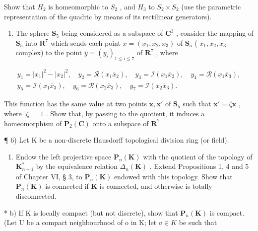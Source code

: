 Show that \(H_{2}\) is homeomorphic to \(S_{2}\) , and \(H_{3}\) to \(S_{2} \times S_{2}\) (use the parametric representation of the quadric by means of its rectilinear generators).

\begin{enumerate}
\def\labelenumi{\arabic{enumi})}
\setcounter{enumi}{4}
\tightlist
\item
  The sphere \(\mathbf{S}_5\) being considered as a subspace of \(\mathbf{C}^3\) , consider the mapping of \(\mathbf{S}_5\) into \(\mathbf{R}^7\) which sends each point \(x = (x_1, x_2, x_3)\) of \(\mathbf{S}_5\) ( \(x_1, x_2, x_3\) complex) to the point \(y = (y_i)_{1 \leqslant i \leqslant 7}\) of \(\mathbf{R}^7\) , where
\end{enumerate}

\[
\begin{array}{c} y _ {1} = | x _ {1} | ^ {2} - | x _ {2} | ^ {2}, \quad y _ {2} = \mathcal {R} (x _ {1} \overline {{x}} _ {2}), \quad y _ {3} = \mathcal {I} (x _ {1} \overline {{x}} _ {2}), \quad y _ {4} = \mathcal {R} (x _ {1} \overline {{x}} _ {3}), \\ y _ {5} = \mathcal {I} (x _ {1} \overline {{x}} _ {3}), \quad y _ {6} = \mathcal {R} (x _ {2} \overline {{x}} _ {3}), \quad y _ {7} = \mathcal {I} (x _ {2} \overline {{x}} _ {3}). \end{array}
\]

This function has the same value at two points \(\pmb{x}, \pmb{x}'\) of \(\mathbf{S}_5\) such that \(\pmb{x}' = \zeta \pmb{x}\) , where \(|\zeta| = 1\) . Show that, by passing to the quotient, it induces a homeomorphism of \(\mathbf{P}_2(\mathbf{C})\) onto a subspace of \(\mathbf{R}^7\) .

¶ 6) Let K be a non-discrete Hausdorff topological division ring (or field).

\begin{enumerate}
\def\labelenumi{\alph{enumi})}
\tightlist
\item
  Endow the left projective space \(\mathbf{P}_n(\mathbf{K})\) with the quotient of the topology of \(\mathbf{K}_{n+1}^*\) by the equivalence relation \(\Delta_n(\mathbf{K})\) . Extend Propositions 1, 4 and 5 of Chapter VI, § 3, to \(\mathbf{P}_n(\mathbf{K})\) endowed with this topology. Show that \(\mathbf{P}_n(\mathbf{K})\) is connected if \(\mathbf{K}\) is connected, and otherwise is totally disconnected.
\end{enumerate}

* b) If K is locally compact (but not discrete), show that \(\mathbf{P}_{n}(\mathbf{K})\) is compact. (Let U be a compact neighbourhood of o in K; let \(a \in K\) be such that

